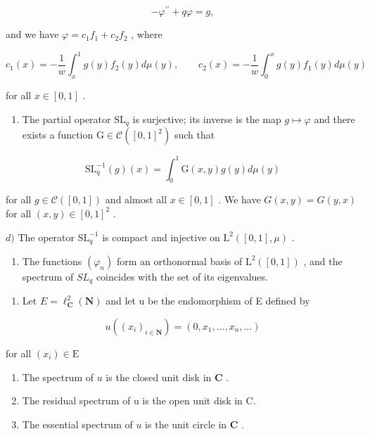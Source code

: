 \[
- \varphi^ {\prime \prime} + q \varphi = g,
\]

and we have \(\varphi = c_{1}f_{1} + c_{2}f_{2}\) , where

\[
c _ {1} (x) = - \frac {1}{w} \int_ {x} ^ {1} g (y) f _ {2} (y) d \mu (y), \qquad c _ {2} (x) = - \frac {1}{w} \int_ {0} ^ {x} g (y) f _ {1} (y) d \mu (y)
\]

for all \(x \in [0,1]\) .

\begin{enumerate}
\def\labelenumi{\alph{enumi})}
\setcounter{enumi}{2}
\tightlist
\item
  The partial operator \(\mathrm{SL}_q\) is surjective; its inverse is the map \(g\mapsto \varphi\) and there exists a function \(\mathrm{G}\in \mathcal{C}([0,1]^2)\) such that
\end{enumerate}

\[
\mathrm{SL} _ {q} ^ {- 1} (g) (x) = \int_ {0} ^ {1} \mathrm{G} (x, y) g (y) d \mu (y)
\]

for all \(g \in \mathcal{C}([0,1])\) and almost all \(x \in [0,1]\) . We have \(G(x,y) = G(y,x)\) for all \((x,y) \in [0,1]^2\) .

\(d)\) The operator \(\mathrm{SL}_q^{-1}\) is compact and injective on \(\mathrm{L}^2 ([0,1],\mu)\) .

\begin{enumerate}
\def\labelenumi{\alph{enumi})}
\setcounter{enumi}{4}
\tightlist
\item
  The functions \((\varphi_{n})\) form an orthonormal basis of \(\mathrm{L}^{2}([0,1])\) , and the spectrum of \(SL_{q}\) coincides with the set of its eigenvalues.
\end{enumerate}

\begin{enumerate}
\def\labelenumi{\arabic{enumi})}
\setcounter{enumi}{22}
\tightlist
\item
  Let \(E = \ell_{\mathbf{C}}^{2}(\mathbf{N})\) and let u be the endomorphism of E defined by
\end{enumerate}

\[
u ((x _ {i}) _ {i \in \mathbf {N}}) = (0, x _ {1}, \dots , x _ {n}, \dots)
\]

for all \((x_{i})\in \mathrm{E}\)

\begin{enumerate}
\def\labelenumi{\alph{enumi})}
\item
  The spectrum of \(u\) is the closed unit disk in \(\mathbf{C}\) .
\item
  The residual spectrum of u is the open unit disk in C.
\item
  The essential spectrum of \(u\) is the unit circle in \(\mathbf{C}\) .
\end{enumerate}

